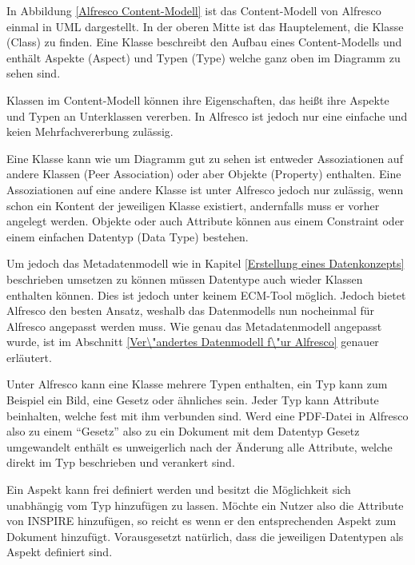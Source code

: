 In Abbildung \ref{Alfresco Content-Modell} ist das Content-Modell von Alfresco einmal in UML dargestellt. In der oberen Mitte ist das Hauptelement, die Klasse (Class) zu finden. Eine Klasse beschreibt den Aufbau eines Content-Modells und enth\"alt Aspekte (Aspect) und Typen (Type) welche ganz oben im Diagramm zu sehen sind. \cite{Professional_Alfresco}

Klassen im Content-Modell k\"onnen ihre Eigenschaften, das hei\ss{}t ihre Aspekte und Typen an Unterklassen vererben. In Alfresco ist jedoch nur eine einfache und keien Mehrfachvererbung zul\"assig.

Eine Klasse kann wie um Diagramm gut zu sehen ist entweder Assoziationen auf andere Klassen (Peer Association) oder aber Objekte (Property) enthalten. Eine Assoziationen auf eine andere Klasse ist unter Alfresco jedoch nur zul\"assig, wenn schon ein Kontent der jeweiligen Klasse existiert, andernfalls muss er vorher angelegt werden. Objekte oder auch Attribute k\"onnen aus einem Constraint oder einem einfachen Datentyp (Data Type) bestehen.

Um jedoch das Metadatenmodell wie in Kapitel \ref{Erstellung eines Datenkonzepts} beschrieben umsetzen zu k\"onnen m\"ussen Datentype auch wieder Klassen enthalten k\"onnen. Dies ist jedoch unter keinem \ac{ECM}-Tool m\"oglich. Jedoch bietet Alfresco den besten Ansatz, weshalb das Datenmodells nun nocheinmal f\"ur Alfresco angepasst werden muss. Wie genau das Metadatenmodell angepasst wurde, ist im Abschnitt \ref{Ver\"andertes Datenmodell f\"ur Alfresco} genauer erl\"autert.

Unter Alfresco kann eine Klasse mehrere Typen enthalten, ein Typ kann zum Beispiel ein Bild, eine Gesetz oder \"ahnliches sein. Jeder Typ kann Attribute beinhalten, welche fest mit ihm verbunden sind. Werd eine PDF-Datei in Alfresco also zu einem "`Gesetz"' also zu ein Dokument mit dem Datentyp Gesetz umgewandelt enth\"alt es unweigerlich nach der \"Anderung alle Attribute, welche direkt im Typ beschrieben und verankert sind.

Ein Aspekt kann frei definiert werden und besitzt die M\"oglichkeit sich unabh\"angig vom Typ hinzuf\"ugen zu lassen. M\"ochte ein Nutzer also die Attribute von \ac{INSPIRE} hinzuf\"ugen, so reicht es wenn er den entsprechenden Aspekt zum Dokument hinzuf\"ugt. Vorausgesetzt nat\"urlich, dass die jeweiligen Datentypen als Aspekt definiert sind.

